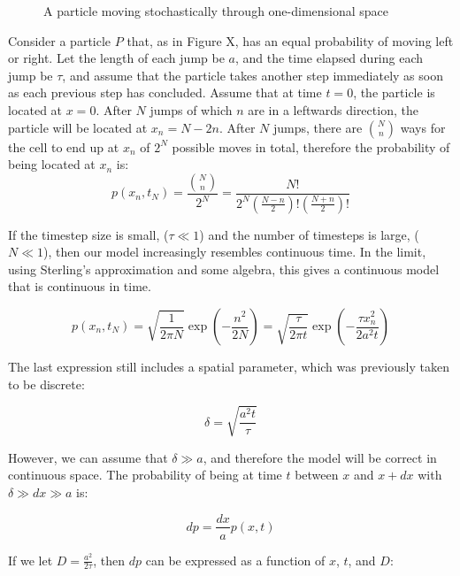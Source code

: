 \documentclass[12pt]{article}
\begin{document}
\begin{figure}[H]
\centering
\caption{A particle moving stochastically through 
one-dimensional space}
\end{figure}

Consider a particle \(P\) that, as in Figure X, has an equal probability of 
moving left or right. Let the length of each jump be \(a\), and 
the time elapsed during each jump be \(\tau\), and assume that 
the particle takes another step immediately as soon as each previous 
step has concluded. Assume that at time 
\(t=0\), the particle is located at \(x=0\). After \(N\) jumps of which \(n\) are in a 
leftwards direction, the particle will be located at \(x_n = N-2n\). 
After \(N\) jumps, there are \(\binom{N}{n}\) ways 
for the cell to end up at \(x_n\) of \(2^N\) possible moves in 
total, therefore the probability of being located at \(x_n\) is:
\begin{equation} 
  p(x_n,t_N) = \frac{\binom{N}{n}}{2^N} = \frac{N!}{2^N(\frac{N-n}{2})!(\frac{N+n}{2})!}
\end{equation}

If the timestep size is small, (\(\tau \ll 1\)) and the number of timesteps is large, 
(\(N \ll 1\)), then our model increasingly resembles continuous time. 
In the limit, using Sterling's approximation 
and some algebra, this gives a continuous model that is continuous in 
time.

\begin{equation}
  p(x_n,t_N) = \sqrt{\frac{1}{2\pi N}}\exp(-\frac{n^2}{2N}) = \sqrt{\frac{\tau}{2\pi t}}\exp(-\frac{\tau x^2_n}{2a^2t})
\end{equation}

The last expression still includes a spatial parameter, which was 
previously taken to be discrete: 

\begin{equation}
  \delta = \sqrt{\frac{a^2t}{\tau}}
\end{equation}

However, we can assume that \(\delta \gg a\), and therefore the 
model will be correct in continuous space. The probability of being at 
time \(t\) between \(x\) and \(x+dx\) with \(\delta \gg dx \gg a\) is:

\begin{equation}
  dp = \frac{dx}{a}p(x,t)
\end{equation}

If we let \(D = \frac{a^2}{2\tau}\), then \(dp\) can be expressed as a 
function of \(x\), \(t\), and \(D\):
\end{document}
